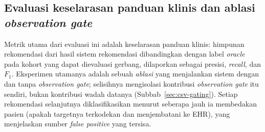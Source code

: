 \subsection{Evaluasi keselarasan panduan klinis dan ablasi \emph{observation gate}}
Metrik utama dari evaluasi ini adalah keselarasan panduan klinis: himpunan rekomendasi dari hasil sistem rekomendasi
dibandingkan dengan label \emph{oracle} pada kohort yang dapat dievaluasi gerbang,
dilaporkan sebagai presisi, \emph{recall}, dan $F_1$. Eksperimen utamanya adalah sebuah
\emph{ablasi} yang menjalankan sistem dengan dan tanpa \emph{observation gate}; selisihnya
mengisolasi kontribusi \emph{observation gate} itu sendiri, bukan kontribusi wadah datanya
(Subbab~\ref{sec:csv-gating}). Setiap rekomendasi selanjutnya
diklasifikasikan menurut seberapa jauh ia membedakan pasien (apakah targetnya terkodekan dan
menjembatani ke EHR), yang menjelaskan sumber \emph{false positive} yang tersisa.

